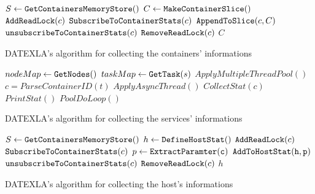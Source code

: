 \documentclass{article}
\begin{document}
\begin{algorithm}
$S \leftarrow {\tt GetContainersMemoryStore}()$\;
$C \leftarrow {\tt MakeContainerSlice}()$\;
 {
    ${\tt AddReadLock}(c)$\;
    ${\tt SubscribeToContainerStats}(c)$\;
    ${\tt AppendToSlice}(c, C)$\;
    ${\tt unsubscribeToContainerStats}(c)$\;
    ${\tt RemoveReadLock}(c)$\;
}
\Return $C$\;
\caption{DATEXLA's algorithm for collecting the containers' informations}
\end{algorithm}

\begin{algorithm}
$nodeMap \leftarrow {\tt GetNodes}()$\;
$taskMap \leftarrow {\tt GetTask}(s)$\;
$ApplyMultipleThreadPool()$\;
 {
    $c = ParseContainerID(t)$\;
    $ApplyAsyncThread()$\; 
    \Indp{} {
        $CollectStat(c)$\;
        $PrintStat()$\;
    }
}
$PoolDoLoop()$
\caption{DATEXLA's algorithm for collecting the services' informations}
\end{algorithm}

\begin{algorithm}
$S \leftarrow {\tt GetContainersMemoryStore}()$\;
$h \leftarrow {\tt DefineHostStat}()$\;
 {
    ${\tt AddReadLock}(c)$\;
    ${\tt SubscribeToContainerStats}(c)$\;
    $p \leftarrow {\tt ExtractParamter(c)}$\;
    ${\tt AddToHostStat(h, p)}$\;
    ${\tt unsubscribeToContainerStats}(c)$\;
    ${\tt RemoveReadLock}(c)$\;
}
\Return $h$\;
\caption{DATEXLA's algorithm for collecting the host's informations}
\end{algorithm}
\end{document}
